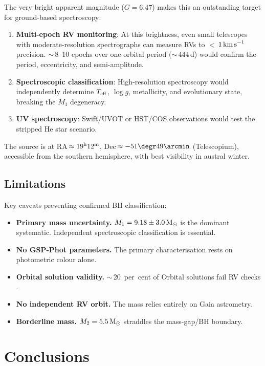 \documentclass[usenatbib,fleqn]{mnras}
\newcommand{\Msun}{{\rm M}_\odot}
\newcommand{\kms}{{\rm km\,s}^{-1}}
\begin{document}
The very bright apparent magnitude ($G = 6.47$) makes this an
outstanding target for ground-based spectroscopy:
\begin{enumerate}
\item \textbf{Multi-epoch RV monitoring}: At this brightness,
  even small telescopes with moderate-resolution spectrographs can
  measure RVs to $<$\,$1\,\kms$ precision.  $\sim$\,8--10 epochs
  over one orbital period ($\sim$\,$444$\,d) would confirm the
  period, eccentricity, and semi-amplitude.
\item \textbf{Spectroscopic classification}: High-resolution
  spectroscopy would independently determine $T_{\rm eff}$,
  $\log g$, metallicity, and evolutionary state, breaking the
  $M_1$ degeneracy.
\item \textbf{UV spectroscopy}: Swift/UVOT or HST/COS observations
  would test the stripped He star scenario.
\end{enumerate}

The source is at RA\,$\approx 19^{\rm h}12^{\rm m}$,
Dec\,$\approx -51\degr49\arcmin$ (Telescopium), accessible from
the southern hemisphere, with best visibility in austral winter.

\subsection{Limitations}

Key caveats preventing confirmed BH classification:
\begin{itemize}
\item \textbf{Primary mass uncertainty.}  $M_1 = 9.18 \pm 3.0\,\Msun$
  is the dominant systematic.  Independent spectroscopic
  classification is essential.
\item \textbf{No GSP-Phot parameters.}  The primary characterisation
  rests on photometric colour alone.
\item \textbf{Orbital solution validity.}  $\sim$\,20~per~cent of
  Orbital solutions fail RV checks \citep{ElBadry2024}.
\item \textbf{No independent RV orbit.}  The mass relies entirely
  on Gaia astrometry.
\item \textbf{Borderline mass.}  $M_2 = 5.5\,\Msun$ straddles the
  mass-gap/BH boundary.
\end{itemize}

\section{Conclusions}
\label{sec:conclusions}
\end{document}

